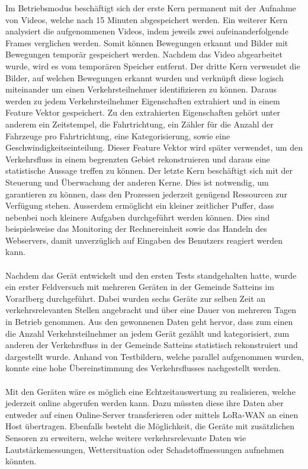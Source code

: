 Im Betriebsmodus beschäftigt sich der erste Kern permanent mit der Aufnahme von Videos, welche nach 15 Minuten abgespeichert werden. Ein weiterer Kern analysiert die aufgenommenen Videos, indem jeweils zwei aufeinanderfolgende Frames verglichen werden. Somit können Bewegungen erkannt und Bilder mit Bewegungen temporär gespeichert werden. Nachdem das Video abgearbeitet wurde, wird es vom temporären Speicher entfernt. Der dritte Kern verwendet die Bilder, auf welchen Bewegungen erkannt wurden und verknüpft diese logisch miteinander um einen Verkehrsteilnehmer identifizieren zu können. Daraus werden zu jedem Verkehrsteilnehmer Eigenschaften extrahiert und in einem Feature Vektor gespeichert. Zu den extrahierten Eigenschaften gehört unter anderem ein Zeitstempel, die Fahrtrichtung, ein Zähler für die Anzahl der Fahrzeuge pro Fahrtrichtung, eine Kategorisierung, sowie eine Geschwindigkeitseinteilung. Dieser Feature Vektor wird später verwendet, um den Verkehrsfluss in einem begrenzten Gebiet rekonstruieren und daraus eine statistische Aussage treffen zu können. Der letzte Kern beschäftigt sich mit der Steuerung und Überwachung der anderen Kerne. Dies ist notwendig, um garantieren zu können, dass den Prozessen jederzeit genügend Ressourcen zur Verfügung stehen. Ausserdem ermöglicht ein kleiner zeitlicher Puffer, dass nebenbei noch kleinere Aufgaben durchgeführt werden können. Dies sind beispielsweise das Monitoring der Rechnereinheit sowie das Handeln des Webservers, damit unverzüglich auf Eingaben des Benutzers reagiert werden kann.\\\\
Nachdem das Gerät entwickelt und den ersten Tests standgehalten hatte, wurde ein erster Feldversuch mit mehreren Geräten in der Gemeinde Satteins im Vorarlberg durchgeführt. Dabei wurden sechs Geräte zur selben Zeit an verkehrsrelevanten Stellen angebracht und über eine Dauer von mehreren Tagen in Betrieb genommen. Aus den gewonnenen Daten geht hervor, dass zum einen die Anzahl Verkehrsteilnehmer an jedem Gerät gezählt und kategorisiert, zum anderen der Verkehrsfluss in der Gemeinde Satteins statistisch rekonstruiert und dargestellt wurde. Anhand von Testbildern, welche parallel aufgenommen wurden, konnte eine hohe Übereinstimmung des Verkehrsflusses nachgestellt werden.\\\\
Mit den Geräten wäre es möglich eine Echtzeitauswertung zu realisieren, welche jederzeit online abgerufen werden kann. Dazu müssten diese ihre Daten aber entweder auf einen Online-Server transferieren oder mittels LoRa-WAN an einen Host übertragen. Ebenfalls besteht die Möglichkeit, die Geräte mit zusätzlichen Sensoren zu erweitern, welche weitere verkehrsrelevante Daten wie Lautstärkemessungen, Wettersituation oder Schadstoffmessungen aufnehmen könnten.
\newpage
